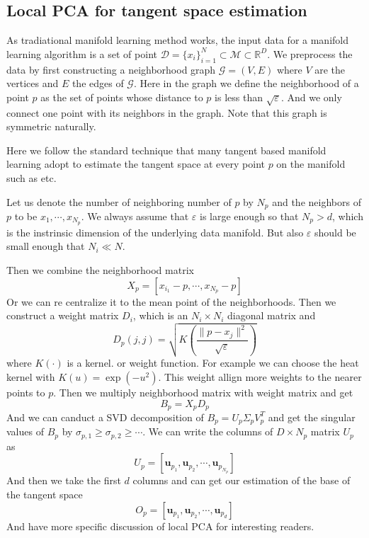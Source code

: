\documentclass{article}
\begin{document}
\subsection{Local PCA for tangent space estimation}
As tradiational manifold learning method works, the input data for a manifold learning algorithm is a set of point $\mathcal{D}=\{x_i\}_{i=1}^N \subset \mathcal{M} \subset \mathbb{R}^D$. We preprocess the data by first constructing a neighborhood graph $\mathcal{G}=(V,E)$ where $V$ are the vertices and $E$ the edges of $\mathcal{G}$. Here in the graph we define the neighborhood of a point $p$ as the set of points whose distance to $p$ is less than $\sqrt{\varepsilon}$. And we only connect one point with its neighbors in the graph. Note that this graph is symmetric naturally.
\par
Here we follow the standard technique that many tangent based manifold learning adopt to estimate the tangent space at every point $p$ on the manifold such as \cite{VDM} \cite{ltsa} etc. 
\par
Let us denote the number of neighboring number of $p$ by $N_p$ and the neighbors of $p$ to be $x_1,\cdots,x_{N_p}$. We always assume that $\varepsilon$ is large enough so that $N_p>d$, which is the instrinsic dimension of the underlying data manifold. But also $\varepsilon$ should be small enough that $N_i\ll N$. 
\par
Then we combine the neighborhood matrix
\begin{equation}
	X_p = [x_{i_1}-p,\cdots,x_{N_p}-p]
\end{equation}
Or we can re centralize it to the mean point of the neighborhoods. Then we construct a weight matrix $D_i$, which is an $N_i\times N_i$ diagonal matrix and
\begin{equation}
	D_p(j,j)=\sqrt{K\left(\frac{\parallel p-x_j\parallel ^2}{\sqrt{\varepsilon}}\right)}
\end{equation}
where $K(\cdot)$ is a kernel. or weight function. For example we can choose the heat kernel with $K(u)=\exp(-u^2)$. This weight allign more weights to the nearer points to $p$. Then we multiply neighborhood matrix with weight matrix and get
\begin{equation}
	B_p=X_pD_p
\end{equation}
And we can canduct a SVD decomposition of $B_p=U_p\Sigma_pV_p^T$ and get the singular values of $B_p$ by $\sigma_{p,1}\geq\sigma_{p,2}\geq\cdots$. We can write the columns of $D \times N_p$ matrix $U_p$ as
\begin{equation}
	U_p=[\boldsymbol{u}_{p_1},\boldsymbol{u}_{p_2},\cdots,\boldsymbol{u}_{p_{N_p}}]
\end{equation}
And then we take the first $d$ columns and can get our estimation of the base of the tangent space
\begin{equation}
	O_p=[\boldsymbol{u}_{p_1},\boldsymbol{u}_{p_2},\cdots,\boldsymbol{u}_{p_{d}}]
\end{equation}
And \cite{VDM} have more specific discussion of local PCA for interesting readers.
\end{document}
